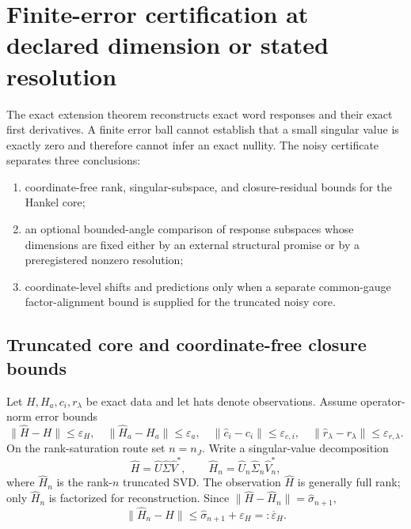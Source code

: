 \documentclass[aps,prl,reprint,superscriptaddress,nofootinbib]{revtex4-2}
\newcommand{\eps}{\varepsilon}
\begin{document}
\section{Finite-error certification at declared dimension or stated resolution}
\label{sec:perturbed}

The exact extension theorem reconstructs exact word responses and their exact first derivatives.  A finite error ball cannot establish that a small singular value is exactly zero and therefore cannot infer an exact nullity.  The noisy certificate separates three conclusions:
\begin{enumerate}
\item coordinate-free rank, singular-subspace, and closure-residual bounds for the Hankel core;
\item an optional bounded-angle comparison of response subspaces whose dimensions are fixed either by an external structural promise or by a preregistered nonzero resolution;
\item coordinate-level shifts and predictions only when a separate common-gauge factor-alignment bound is supplied for the truncated noisy core.
\end{enumerate}

\subsection{Truncated core and coordinate-free closure bounds}

Let $H,H_a,c_i,r_\lambda$ be exact data and let hats denote observations.  Assume operator-norm error bounds
\begin{equation}
 \|\widehat H-H\|\le\eps_H,
 \quad \|\widehat H_a-H_a\|\le\eps_a,
 \quad \|\widehat c_i-c_i\|\le\eps_{c,i},
 \quad \|\widehat r_\lambda-r_\lambda\|\le\eps_{r,\lambda}.
 \label{eq:data-errors}
\end{equation}
On the rank-saturation route set $n=n_J$.  Write a singular-value decomposition
\begin{equation}
 \widehat H=\widehat U\widehat\Sigma\widehat V^*,
 \qquad
 \widehat H_n=\widehat U_n\widehat\Sigma_n\widehat V_n^*,
 \label{eq:H-truncation}
\end{equation}
where $\widehat H_n$ is the rank-$n$ truncated SVD.  The observation $\widehat H$ is generally full rank; only $\widehat H_n$ is factorized for reconstruction.  Since
$\|\widehat H-\widehat H_n\|=\widehat\sigma_{n+1}$,
\begin{equation}
 \|\widehat H_n-H\|
 \le \widehat\sigma_{n+1}+\eps_H
 =:\overline\eps_H.
 \label{eq:truncated-core-error}
\end{equation}
\end{document}

